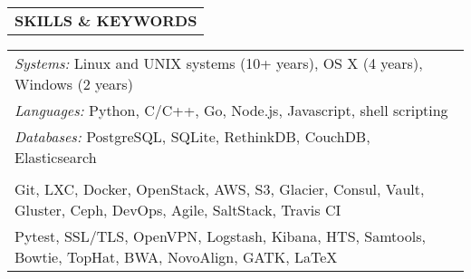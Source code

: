 \begin{tabularx}{\textwidth}{L}
    \textbf{SKILLS \& KEYWORDS}
\end{tabularx}

\begin{small}
\begin{tabularx}{\textwidth}{X}
    \textit{Systems:} Linux and UNIX systems (10+ years), OS X (4 years), Windows (2 years) \\
    \textit{Languages:} Python, C/C++, Go, Node.js, Javascript, shell scripting \\
    \textit{Databases:} PostgreSQL, SQLite, RethinkDB, CouchDB, Elasticsearch \\
    \\
    Git, LXC, Docker, OpenStack, AWS, S3, Glacier, Consul, Vault, Gluster, Ceph, DevOps, Agile, SaltStack, Travis CI \\
    Pytest, SSL/TLS, OpenVPN, Logstash, Kibana, HTS, Samtools, Bowtie, TopHat, BWA, NovoAlign, GATK, LaTeX \\
\end{tabularx}
\end{small}
